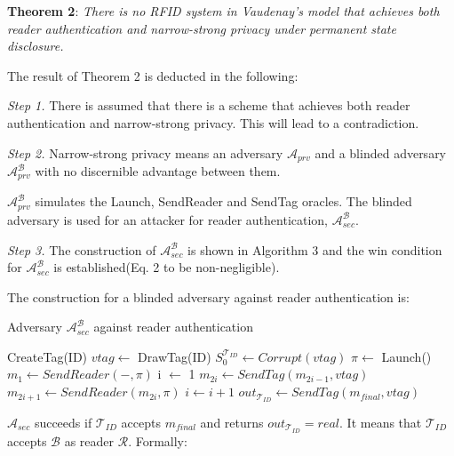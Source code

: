     \textbf{Theorem 2}: \textit{There is no RFID system in Vaudenay's model that achieves both reader authentication and narrow-strong privacy 
    under permanent state disclosure.}

    The result of Theorem 2 is deducted in the following:

    \textit{Step 1.} There is assumed that there is a scheme that achieves both reader authentication and narrow-strong privacy.
    This will lead to a contradiction.

    \textit{Step 2.} Narrow-strong privacy means an adversary $\mathcal{A}_{prv}$ and a blinded adversary $\mathcal{A}_{prv}^{\mathcal{B}}$  with no discernible
    advantage between them.
    
    $\mathcal{A}_{prv}^{\mathcal{B}}$ simulates the Launch, SendReader and SendTag oracles.
    The blinded adversary is used for an attacker for reader authentication, $\mathcal{A}_{sec}^{\mathcal{B}}$.
    
    \textit{Step 3.} The construction of $\mathcal{A}_{sec}^{\mathcal{B}}$ is shown in Algorithm 3 and the win condition for $\mathcal{A}_{sec}^{\mathcal{B}}$
    is established(Eq. 2 to be non-negligible).

    The construction for a blinded adversary against reader authentication is:
    \begin{algorithm}[H] %
        \centering
        \caption{Adversary $\mathcal{A}_{sec}^{\mathcal{B}}$ against reader authentication}
        \begin{algorithmic}[1] %
            \State CreateTag(ID)
            \State $vtag \leftarrow$ DrawTag(ID)
            \State $S_0^{\mathcal{T}_{ID}} \gets Corrupt(vtag)$
            \State $\pi \leftarrow$ Launch() 
            \State $m_1 \leftarrow SendReader(-,\pi)$ 
            \State i $\leftarrow$ 1
                \State $m_{2i} \gets SendTag(m_{2i-1}, vtag)$ 
                \State $m_{2i+1} \gets SendReader(m_{2i}, \pi)$ 
                \State $i \gets i+1$
            \EndWhile
            \State $out_{\mathcal{T}_{ID}} \gets SendTag(m_{final}, vtag)$ 
        \end{algorithmic}
    \end{algorithm}

    $\mathcal{A}_{sec}$ succeeds if $\mathcal{T}_{ID}$ accepts $m_{final}$ and returns $out_{\mathcal{T}_{ID}} = real$.
    It means that $\mathcal{T}_{ID}$ accepts $\mathcal{B}$ as reader $\mathcal{R}$. Formally:

